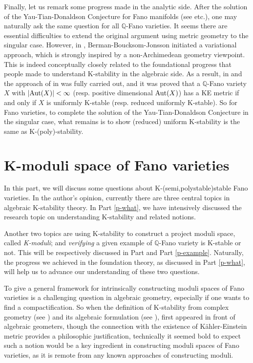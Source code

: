 \documentclass[12pt,reqno]{amsart}%
\theoremstyle{definition}
\theoremstyle{remark}
\newcommand{\bQ}{{\mathbb{Q}}}
\begin{document}
\smallskip

Finally, let us remark some progress made in the analytic side. After the solution of the Yau-Tian-Donaldson Conjecture for Fano manifolds (see \cite{CDS, Tia15, Sze16} etc.), one may naturally ask the same question for all $\bQ$-Fano varieties. It seems there are essential difficulties to extend the original argument using metric geometry to the singular case. However, in \cite{BBJ15}, Berman-Boucksom-Jonsson initiated a variational approach, which is strongly inspired by a non-Archimedean geometry viewpoint. This is indeed conceptually closely related to the foundational progress that people made to understand K-stability in the algebraic side. As a result, in \cite{LTW19} and \cite{Li19} the approach of in \cite{BBJ15} was fully carried out, and it was proved that a $\bQ$-Fano variety $X$ with $|{\rm Aut}(X)|<\infty$ (resp. positive dimensional ${\rm Aut}(X)$) has a KE metric if and only if $X$ is uniformly K-stable (resp. reduced uniformly K-stable). So for Fano varieties, to complete the solution of the Yau-Tian-Donaldson Conjecture in the singular case, what remains is to show (reduced) uniform K-stability is the same as K-(poly)-stability. 

\clearpage

\part{K-moduli space of Fano varieties}\label{p-moduli}
In this part, we will discuss some questions about K-(semi,polystable)stable Fano varieties. In the author's opinion, currently there are three central topics in algebraic K-stability theory. 
In Part \ref{p-what}, we have intensively discussed the research topic on understanding  K-stability and related notions. 

 Another two topics are using K-stability to construct a project moduli space, called {\it K-moduli}; and {\it verifying} a given example of $\mathbb{Q}$-Fano variety is K-stable or not.   This will be respectively discussed in Part \ref{p-moduli} and Part \ref{p-example}. Naturally, the progress we achieved in the foundation theory, as discussed in Part \ref{p-what}, will help us to advance our understanding of these two questions. 

\smallskip

To give a general framework for intrinsically constructing  moduli spaces of Fano varieties is a challenging question in algebraic geometry, especially if one wants to find a compactification. So when the definition of K-stability from complex geometry (see \cite{Tia97}) and its algebraic formulation (see \cite{Don02}), first appeared in front of algebraic geometers, though the connection with the existence of K\"ahler-Einstein metric provides a philosophic justification, technically it seemed bold to expect such a notion would be a key ingredient in constructing moduli spaces of Fano varieties, as it is remote from any known approaches of constructing moduli. 
\end{document}
